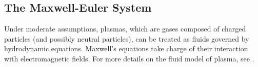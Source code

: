 \documentclass{article}
\begin{document}
\begin{comment}
\begin{figure}
    \centering
    \begin{tikzpicture}
    \node (nw) {\Large $P^\lambda_h$};
    \node (ne) [right=3cm of nw]{\Large $P^\lambda$};
    \node (sw) [below=of nw]{\Large $P^0_h$};
    \node (se) [right=3cm of sw]{\Large $P^0$};
    \draw[->] (nw.east)  -- node [above,midway] {$h\rightarrow0$} (ne.west) ;
    \draw[->] (nw.east)  --  (ne.west) ;
    \draw[->] (nw.south) -- node [left,midway] {$\lambda\rightarrow0$} (sw.north);
    \draw[->] (nw.south) -- node {} (sw.north);
    \draw[->] (sw.east)  -- node [above,midway] {$h\rightarrow0$}(se.west);
    \draw[->] (ne.south) -- node [left,midway] {$\lambda\rightarrow0$} (se.north);
    \end{tikzpicture}
    \caption{Commuting diagram of AP schemes}
    \label{fig:commuting_diagram_ap}
\end{figure}
\end{comment}

\subsection{The Maxwell-Euler System}
Under moderate assumptions, plasmas, which are gases composed of charged particles (and possibly neutral particles), can be treated as fluids governed by hydrodynamic equations. Maxwell's equations take charge of their interaction with electromagnetic fields. For more details on the fluid model of plasma, see \cite{chen2016, remi_2014}.
\end{document}
